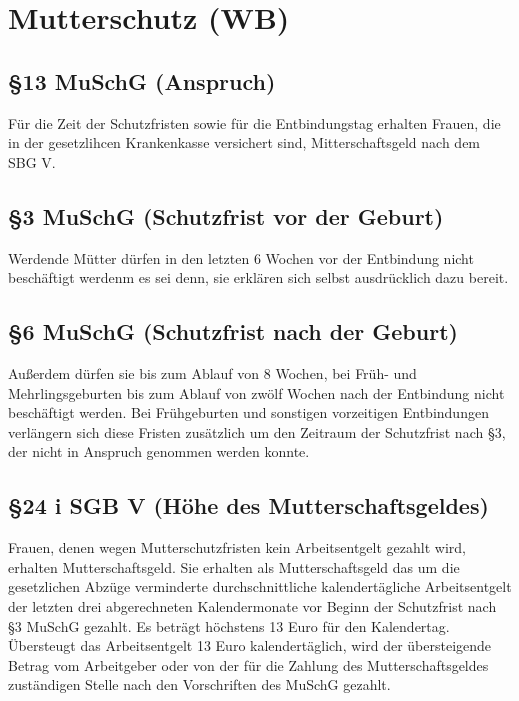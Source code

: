\documentclass[a4paper, 12pt]{report}
\begin{document}
\section{Mutterschutz (WB)}

\subsection{\S 13 MuSchG (Anspruch)}

Für die Zeit der Schutzfristen sowie für die Entbindungstag erhalten Frauen, die
in der gesetzlihcen Krankenkasse versichert sind, Mitterschaftsgeld nach dem SBG
V.

\subsection{\S 3 MuSchG (Schutzfrist vor der Geburt)}

Werdende Mütter dürfen in den letzten 6 Wochen vor der Entbindung nicht
beschäftigt werdenm es sei denn, sie erklären sich selbst ausdrücklich dazu
bereit.

\subsection{\S 6 MuSchG (Schutzfrist nach der Geburt)}

Außerdem dürfen sie bis zum Ablauf von 8 Wochen, bei Früh- und Mehrlingsgeburten
bis zum Ablauf von zwölf Wochen nach der Entbindung nicht beschäftigt werden.
Bei Frühgeburten und sonstigen vorzeitigen Entbindungen verlängern sich diese
Fristen zusätzlich um den Zeitraum der Schutzfrist nach \S 3, der nicht in
Anspruch genommen werden konnte.

\subsection{\S 24 i SGB V (Höhe des Mutterschaftsgeldes)}

Frauen, denen wegen Mutterschutzfristen kein Arbeitsentgelt gezahlt wird,
erhalten Mutterschaftsgeld. Sie erhalten als Mutterschaftsgeld das um die
gesetzlichen Abzüge verminderte durchschnittliche kalendertägliche
Arbeitsentgelt der letzten drei abgerechneten Kalendermonate vor Beginn der
Schutzfrist nach \S 3 MuSchG gezahlt. Es beträgt höchstens 13 Euro für den
Kalendertag. Übersteugt das Arbeitsentgelt 13 Euro kalendertäglich, wird der
übersteigende Betrag vom Arbeitgeber oder von der für die Zahlung des
Mutterschaftsgeldes zuständigen Stelle nach den Vorschriften des MuSchG
gezahlt. \\
\end{document}
